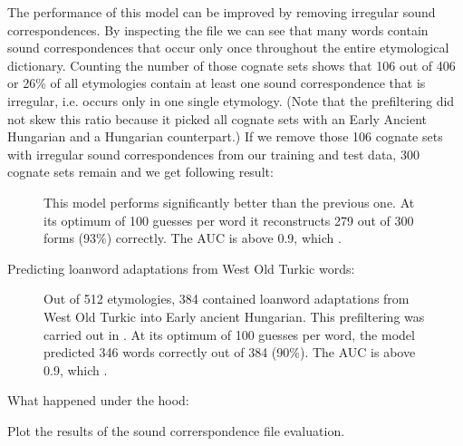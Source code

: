 \documentclass[letterpaper,10pt,english]{sphinxmanual}
\begin{document}
{{{{\sphinxAtStartPar
The performance of this model can be improved by removing irregular sound
correspondences. By inspecting the file  we can see that
many words contain sound correspondences that occur only once throughout
the entire etymological dictionary. Counting the number of those cognate sets
shows that 106 out of 406 or 26\% of all etymologies contain at least one sound
correspondence that is irregular, i.e. occurs only in one single etymology.
(Note that the pre\sphinxhyphen{}filtering did not skew this ratio because it picked all
cognate sets with an Early Ancient Hungarian and a Hungarian counterpart.)
If we remove those 106 cognate sets with irregular sound correspondences
from our training and test data, 300 cognate sets remain and we get following
result:

\begin{figure}[htbp]
\centering
\capstart

\noindent{}
\caption{This model performs significantly better than the previous one. At its
optimum of 100 guesses per word it reconstructs 279 out of 300 forms (93\%)
correctly. The
AUC is above 0.9, which .}\label{\detokenize{mkloanpy:id3}}\end{figure}

\sphinxAtStartPar
Predicting loanword adaptations from West Old Turkic words:

\begin{figure}[htbp]
\centering
\capstart

\noindent{}
\caption{Out of 512 etymologies, 384 contained loanword adaptations from West
Old Turkic into Early ancient Hungarian. This pre\sphinxhyphen{}filtering was carried
out in .
At its optimum of 100 guesses per word, the model predicted 346 words
correctly out of 384 (90\%). The
AUC is above 0.9, which .}\label{\detokenize{mkloanpy:id4}}\end{figure}

\sphinxAtStartPar
What happened under the hood:

\label{\detokenize{mkloanpy:module-ronataswestoldturkiccommands.plot_eval}}
\sphinxAtStartPar
Plot the results of the sound correrspondence file evaluation.

}}}}
\end{document}
